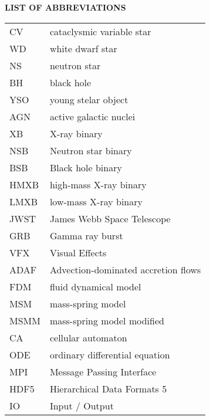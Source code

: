 \newpage
{}
{}
\noindent \Large \textbf{LIST OF ABBREVIATIONS}
\normalsize

\vspace{1cm}

\begin{center}
\def\arraystretch{1.5}%
\setlength\tabcolsep{1cm}
\begin{tabular}{ll}
    CV			& cataclysmic variable star \\
    WD			& white dwarf star \\
    NS          & neutron star \\
    BH          & black hole \\
    YSO         & young stelar object \\
    AGN         & active galactic nuclei \\
    XB          & X-ray binary \\
    NSB         & Neutron star binary \\
    BSB         & Black hole binary \\
    HMXB        & high-mass X-ray binary \\
    LMXB        & low-mass X-ray binary \\
    JWST        & James Webb Space Telescope \\
    GRB         & Gamma ray burst \\
    VFX         & Visual Effects \\
    ADAF        & Advection-dominated accretion flows \\
    FDM			& fluid dynamical model \\
    MSM			& mass-spring model \\
    MSMM		& mass-spring model modified \\
    CA			& cellular automaton \\
    ODE			& ordinary differential equation \\
    MPI         & Message Passing Interface \\
    HDF5        & Hierarchical Data Formats 5 \\
    IO          & Input / Output 
\end{tabular}
\end{center}
